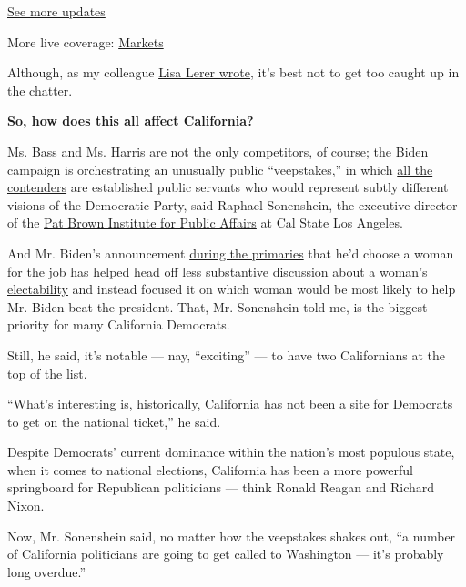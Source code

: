 \href{https://www.nytimes3xbfgragh.onion/2020/08/04/world/coronavirus-cases.html?action=click\&pgtype=Article\&state=default\&region=MAIN_CONTENT_1\&context=storylines_live_updates}{See
more updates}

More live coverage:
\href{https://www.nytimes3xbfgragh.onion/live/2020/08/04/business/stock-market-today-coronavirus?action=click\&pgtype=Article\&state=default\&region=MAIN_CONTENT_1\&context=storylines_live_updates}{Markets}

Although, as my colleague
\href{https://www.nytimes3xbfgragh.onion/2020/08/03/us/politics/joe-biden-vp.html}{Lisa
Lerer wrote}, it's best not to get too caught up in the chatter.

\textbf{So, how does this all affect California?}

Ms. Bass and Ms. Harris are not the only competitors, of course; the
Biden campaign is orchestrating an unusually public ``veepstakes,'' in
which
\href{https://www.nytimes3xbfgragh.onion/article/biden-vice-president-2020.html?}{all
the contenders} are established public servants who would represent
subtly different visions of the Democratic Party, said Raphael
Sonenshein, the executive director of the
\href{https://calstatela.patbrowninstitute.org/}{Pat Brown Institute for
Public Affairs} at Cal State Los Angeles.

And Mr. Biden's announcement
\href{https://www.nytimes3xbfgragh.onion/2020/03/16/us/politics/joe-biden-vp-running-mate.html}{during
the primaries} that he'd choose a woman for the job has helped head off
less substantive discussion about
\href{https://www.nytimes3xbfgragh.onion/2020/03/05/us/warren-presidential-race-2020.html}{a
woman's electability} and instead focused it on which woman would be
most likely to help Mr. Biden beat the president. That, Mr. Sonenshein
told me, is the biggest priority for many California Democrats.

Still, he said, it's notable --- nay, ``exciting'' --- to have two
Californians at the top of the list.

``What's interesting is, historically, California has not been a site
for Democrats to get on the national ticket,'' he said.

Despite Democrats' current dominance within the nation's most populous
state, when it comes to national elections, California has been a more
powerful springboard for Republican politicians --- think Ronald Reagan
and Richard Nixon.

Now, Mr. Sonenshein said, no matter how the veepstakes shakes out, ``a
number of California politicians are going to get called to Washington
--- it's probably long overdue.''

